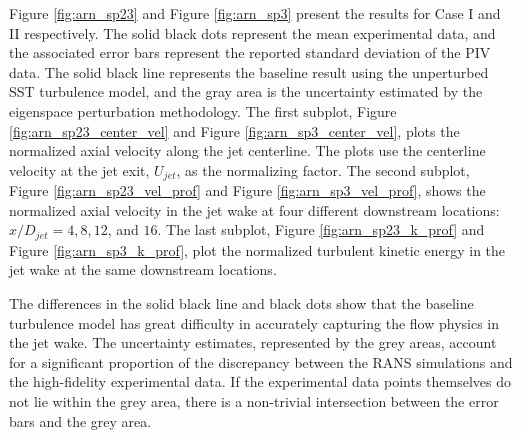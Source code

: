 
Figure \ref{fig:arn_sp23} and Figure \ref{fig:arn_sp3} present the results for Case I and II respectively.
The solid black dots represent the mean experimental data, and the associated error bars represent the reported standard deviation of the PIV data.
The solid black line represents the baseline result using the unperturbed SST turbulence model, and the gray area is the uncertainty estimated by the eigenspace perturbation methodology.
The first subplot, Figure \ref{fig:arn_sp23_center_vel} and Figure \ref{fig:arn_sp3_center_vel}, plots the normalized axial velocity along the jet centerline.
The plots use the centerline velocity at the jet exit, $U_{jet}$, as the normalizing factor.
The second subplot, Figure \ref{fig:arn_sp23_vel_prof} and Figure \ref{fig:arn_sp3_vel_prof}, shows the normalized axial velocity in the jet wake at four different downstream locations: $x/D_{jet}= 4, 8, 12$, and $16$.
The last subplot, Figure \ref{fig:arn_sp23_k_prof} and Figure \ref{fig:arn_sp3_k_prof}, plot the normalized turbulent kinetic energy in the jet wake at the same downstream locations. 

The differences in the solid black line and black dots show that the baseline turbulence model has great difficulty in accurately capturing the flow physics in the jet wake. 
The uncertainty estimates, represented by the grey areas, account for a significant proportion of the discrepancy between the RANS simulations and the high-fidelity experimental data.
If the experimental data points themselves do not lie within the grey area, there is a non-trivial intersection between the error bars and the grey area. 




